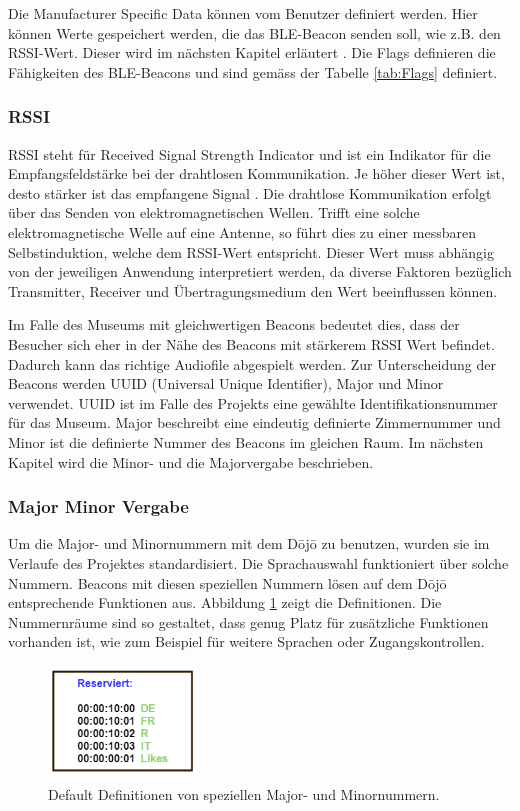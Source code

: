 Die Manufacturer Specific Data können vom Benutzer definiert werden. Hier können Werte gespeichert werden, die das BLE-Beacon senden soll, wie z.B. den RSSI-Wert. Dieser wird im nächsten Kapitel erläutert \cite{9_Teildokument_BT}. Die Flags definieren die Fähigkeiten des BLE-Beacons und sind gemäss der Tabelle \ref{tab:Flags} definiert.

\subsubsection{RSSI}
RSSI steht für Received Signal Strength Indicator und ist ein Indikator für die Empfangsfeldstärke bei der drahtlosen Kommunikation. Je höher dieser Wert ist, desto stärker ist das empfangene Signal \cite{10_Teildokument_BT}. Die drahtlose Kommunikation erfolgt über das Senden von elektromagnetischen Wellen. Trifft eine solche elektromagnetische Welle auf eine Antenne, so führt dies zu einer messbaren Selbstinduktion, welche dem RSSI-Wert entspricht. Dieser Wert muss abhängig von der jeweiligen Anwendung interpretiert werden, da diverse Faktoren bezüglich Transmitter, Receiver und Übertragungsmedium den Wert beeinflussen können.

Im Falle des Museums mit gleichwertigen Beacons bedeutet dies, dass der Besucher sich eher in der Nähe des Beacons mit stärkerem RSSI Wert befindet. Dadurch kann das richtige Audiofile abgespielt werden. Zur Unterscheidung der Beacons werden UUID (Universal Unique Identifier), Major und Minor verwendet. UUID ist im Falle des Projekts eine gewählte Identifikationsnummer für das Museum. Major beschreibt eine eindeutig definierte Zimmernummer und Minor ist die definierte Nummer des Beacons im gleichen Raum. Im nächsten Kapitel wird die Minor- und die Majorvergabe beschrieben.

\subsubsection{Major Minor Vergabe}
Um die Major- und Minornummern mit dem Dōjō zu benutzen, wurden sie im Verlaufe des Projektes standardisiert. Die Sprachauswahl funktioniert über solche Nummern. Beacons mit diesen speziellen Nummern lösen auf dem Dōjō entsprechende Funktionen aus. Abbildung \ref{fig:Bluetooth_def_MM} zeigt die Definitionen. Die Nummernräume sind so gestaltet, dass genug Platz für zusätzliche Funktionen vorhanden ist, wie zum Beispiel für weitere Sprachen oder Zugangskontrollen.

\begin{figure}[htbp!!!!]
	\centering
	\includegraphics[width=0.35\textwidth]{Data/Reserviert_picture.png}
	\caption[Software:Definierte MM]{Default Definitionen von speziellen Major- und Minornummern.}
	\label{fig:Bluetooth_def_MM}
\end{figure}

